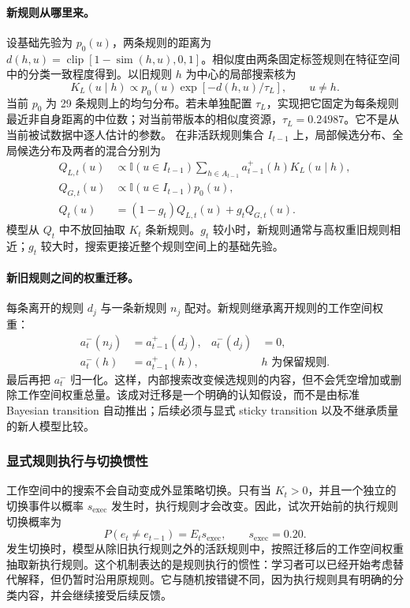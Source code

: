 \paragraph{新规则从哪里来。}
设基础先验为 $p_0(u)$，两条规则的距离为
$d(h,u)=\operatorname{clip}[1-\operatorname{sim}(h,u),0,1]$。相似度由两条固定标签规则在特征空间中的分类一致程度得到。以旧规则 $h$ 为中心的局部搜索核为
\begin{equation}
K_L(u\mid h)
\propto p_0(u)\exp[-d(h,u)/\tau_L],
\qquad u\ne h.
\label{eq:dynamic-local-kernel}
\end{equation}
当前 $p_0$ 为 29 条规则上的均匀分布。若未单独配置 $\tau_L$，实现把它固定为每条规则最近非自身距离的中位数；对当前带版本的相似度资源，$\tau_L=0.24987$。它不是从当前被试数据中逐人估计的参数。
在非活跃规则集合 $I_{t-1}$ 上，局部候选分布、全局候选分布及两者的混合分别为
\begin{align}
Q_{L,t}(u)
&\propto
\mathbb I(u\in I_{t-1})
\sum_{h\in A_{t-1}}a_{t-1}^{+}(h)K_L(u\mid h),
\nonumber\\
Q_{G,t}(u)
&\propto\mathbb I(u\in I_{t-1})p_0(u),
\nonumber\\
Q_t(u)
&=(1-g_t)Q_{L,t}(u)+g_tQ_{G,t}(u).
\label{eq:dynamic-newcomer-proposal}
\end{align}
模型从 $Q_t$ 中不放回抽取 $K_t$ 条新规则。$g_t$ 较小时，新规则通常与高权重旧规则相近；$g_t$ 较大时，搜索更接近整个规则空间上的基础先验。

\paragraph{新旧规则之间的权重迁移。}
每条离开的规则 $d_j$ 与一条新规则 $n_j$ 配对。新规则继承离开规则的工作空间权重：
\begin{align}
a_t^{-}(n_j)&=a_{t-1}^{+}(d_j),
&
a_t^{-}(d_j)&=0,
\nonumber\\
a_t^{-}(h)&=a_{t-1}^{+}(h),
&&h\text{ 为保留规则}.
\label{eq:dynamic-pairwise-transfer}
\end{align}
最后再把 $a_t^{-}$ 归一化。这样，内部搜索改变候选规则的内容，但不会凭空增加或删除工作空间权重总量。该成对迁移是一个明确的认知假设，而不是由标准 Bayesian transition 自动推出；后续必须与显式 sticky transition 以及不继承质量的新人模型比较。


\subsubsection{显式规则执行与切换惯性}

工作空间中的搜索不会自动变成外显策略切换。只有当 $K_t>0$，并且一个独立的切换事件以概率 $s_{\mathrm{exec}}$ 发生时，执行规则才会改变。因此，试次开始前的执行规则切换概率为
\begin{equation}
P(e_t\ne e_{t-1})=E_ts_{\mathrm{exec}},
\qquad s_{\mathrm{exec}}=0.20.
\label{eq:dynamic-execution-hazard}
\end{equation}
发生切换时，模型从除旧执行规则之外的活跃规则中，按照迁移后的工作空间权重抽取新执行规则。这个机制表达的是规则执行的惯性：学习者可以已经开始考虑替代解释，但仍暂时沿用原规则。它与随机按错键不同，因为执行规则具有明确的分类内容，并会继续接受后续反馈。


